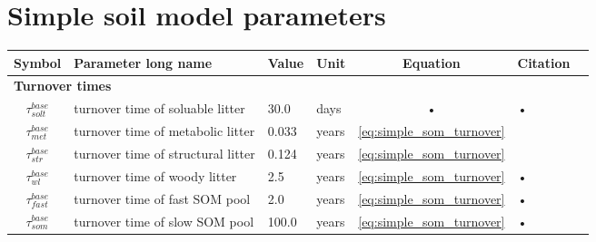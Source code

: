 \documentclass[11pt,oneside,openright,a4paper,fleqn]{book}  %
\begin{document}
\begin{table}
\section{Simple soil model parameters}\label{tab:sb:param}

\begin{tabularx}{\linewidth}{|c|X|l|l|c|l|c|} %
\hline 
Symbol & Parameter long name & Value & Unit & Equation & Citation \\
\hline 

\multicolumn{6}{l}{\bf Turnover times}\\
\hline
$\tau^{base}_{solt}$ & turnover time of soluable litter & 30.0 & days & • & • \\
$\tau^{base}_{met}$ & turnover time of metabolic litter & 0.033 & years & \ref{eq:simple_som_turnover}  & \cite{Parton:1993ud}  \\
$\tau^{base}_{str}$ & turnover time of structural litter & 0.124 & years & \ref{eq:simple_som_turnover}  & \cite{Parton:1993ud} \\
$\tau^{base}_{wl}$ & turnover time of woody litter &  2.5 & years & \ref{eq:simple_som_turnover} & • \\
$\tau^{base}_{fast}$ & turnover time of fast SOM pool & 2.0 & years & \ref{eq:simple_som_turnover} & • \\
$\tau^{base}_{som}$ & turnover time of slow SOM pool & 100.0 & years & \ref{eq:simple_som_turnover} & • \\
\hline 


\end{tabularx}
\end{table}
\end{document}
